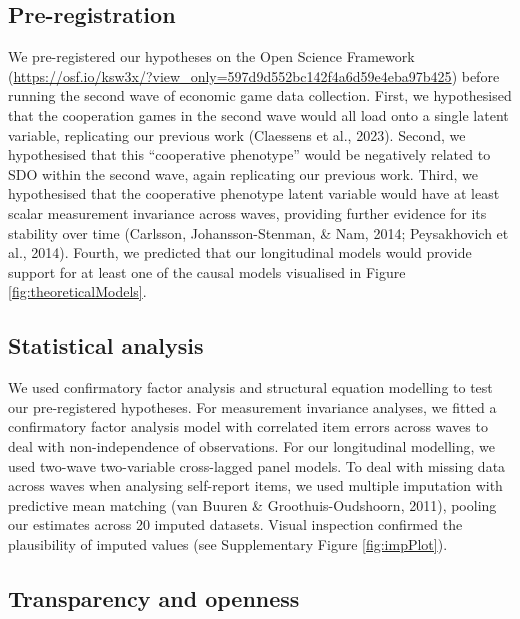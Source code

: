\documentclass[
  man,floatsintext]{apa6}
\begin{document}
\hypertarget{pre-registration}{%
\subsection{Pre-registration}\label{pre-registration}}

We pre-registered our hypotheses on the Open Science Framework (\url{https://osf.io/ksw3x/?view_only=597d9d552bc142f4a6d59e4eba97b425}) before running the second wave of economic game data collection. First, we hypothesised that the cooperation games in the second wave would all load onto a single latent variable, replicating our previous work (Claessens et al., 2023). Second, we hypothesised that this ``cooperative phenotype'' would be negatively related to SDO within the second wave, again replicating our previous work. Third, we hypothesised that the cooperative phenotype latent variable would have at least scalar measurement invariance across waves, providing further evidence for its stability over time (Carlsson, Johansson-Stenman, \& Nam, 2014; Peysakhovich et al., 2014). Fourth, we predicted that our longitudinal models would provide support for at least one of the causal models visualised in Figure \ref{fig:theoreticalModels}.

\hypertarget{statistical-analysis}{%
\subsection{Statistical analysis}\label{statistical-analysis}}

We used confirmatory factor analysis and structural equation modelling to test our pre-registered hypotheses. For measurement invariance analyses, we fitted a confirmatory factor analysis model with correlated item errors across waves to deal with non-independence of observations. For our longitudinal modelling, we used two-wave two-variable cross-lagged panel models. To deal with missing data across waves when analysing self-report items, we used multiple imputation with predictive mean matching (van Buuren \& Groothuis-Oudshoorn, 2011), pooling our estimates across 20 imputed datasets. Visual inspection confirmed the plausibility of imputed values (see Supplementary Figure \ref{fig:impPlot}).

\hypertarget{transparency-and-openness}{%
\subsection{Transparency and openness}\label{transparency-and-openness}}
\end{document}
